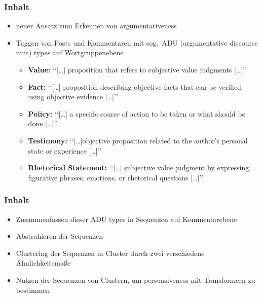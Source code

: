 \documentclass[compress,12pt]{beamer}
\begin{document}
    \begin{frame}
        \frametitle{Inhalt}
        \begin{itemize}
            \item neuer Ansatz zum Erkennen von argumentativeness
            \item Taggen von Posts und Kommentaren mit sog.\ ADU (argumentative discourse unit) types auf Wortgruppenebene
            \begin{itemize}
                \item \textbf{Value:} \lq\lq{}[\ldots] proposition that refers to subjective value judgments [\ldots]\rq\rq{}
                \item \textbf{Fact:} \lq\lq{}[\ldots] proposition describing objective facts that can be verified using objective evidence [\ldots]\rq\rq{}
                \item \textbf{Policy:} \lq\lq{}[\ldots] a specific course of action to be taken or what should be done [\ldots]\rq\rq{}
                \item \textbf{Testimony:} \lq\lq{}[\ldots]objective proposition related to the author’s personal state or experience [\ldots]\rq\rq{}
                \item \textbf{Rhetorical Statement:} \lq\lq{}[\ldots] subjective value judgment by expressing figurative phrases, emotions, or rhetorical questions [\ldots]\rq\rq{}
            \end{itemize}
        \end{itemize}
    \end{frame}

    \begin{frame}
        \frametitle{Inhalt}
        \begin{itemize}
            \item Zusammenfassen dieser ADU types in Sequenzen auf Kommentarebene
            \item Abstrahieren der Sequenzen
            \item Clustering der Sequenzen in Cluster durch zwei verschiedene Ähnlichkeitsmaße
            \item Nutzen der Sequenzen von Clustern, um persuasiveness mit Transformern zu bestimmen
        \end{itemize}

    \end{frame}
\end{document}
